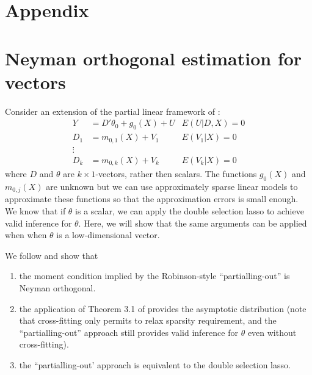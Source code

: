 \documentclass[11pt]{article}
\begin{document}
\clearpage
\section*{Appendix}
\appendix
\section{Neyman orthogonal estimation for  vectors}\label{sec:dsvec}

Consider an extension of the partial linear framework of \cite{belloni:14}:
\begin{align*}
	Y &= D' \theta_0 + g_0(X) + U &E(U|D, X) = 0\\ 
	D_1 &= m_{0,1}(X) + V_1	& E(V_1 |X) = 0\\
	\vdots			\nonumber \\
	D_{k} &= m_{0,k}(X) + V_{k} & E(V_k |X) = 0
\end{align*}
where $D$ and  $\theta$ are $k \times 1$-vectors, rather then scalars. The functions $g_0(X)$ and $m_{0, j}(X)$ are unknown but we can use approximately sparse linear models to approximate these functions so
that the approximation errors is small enough. We know that if $\theta$ is a scalar, we can apply the double selection lasso to
achieve valid inference for $\theta$. Here, we will show that the same arguments can be applied when when $\theta$ is a low-dimensional
vector.

We follow \cite{cherno/etal:18} and %
show that
\begin{enumerate}
\item the moment condition implied by the Robinson-style
``partialling-out'' is Neyman orthogonal.
\item  the application of Theorem 3.1 of \cite{cherno/etal:18} provides the asymptotic distribution (note that cross-fitting only permits to  relax sparsity
requirement, and the ``partialling-out'' approach  still provides valid
inference for $\theta$ even without cross-fitting).
\item the ``partialling-out' approach is equivalent to the double
selection lasso.
\end{enumerate}
\end{document}
